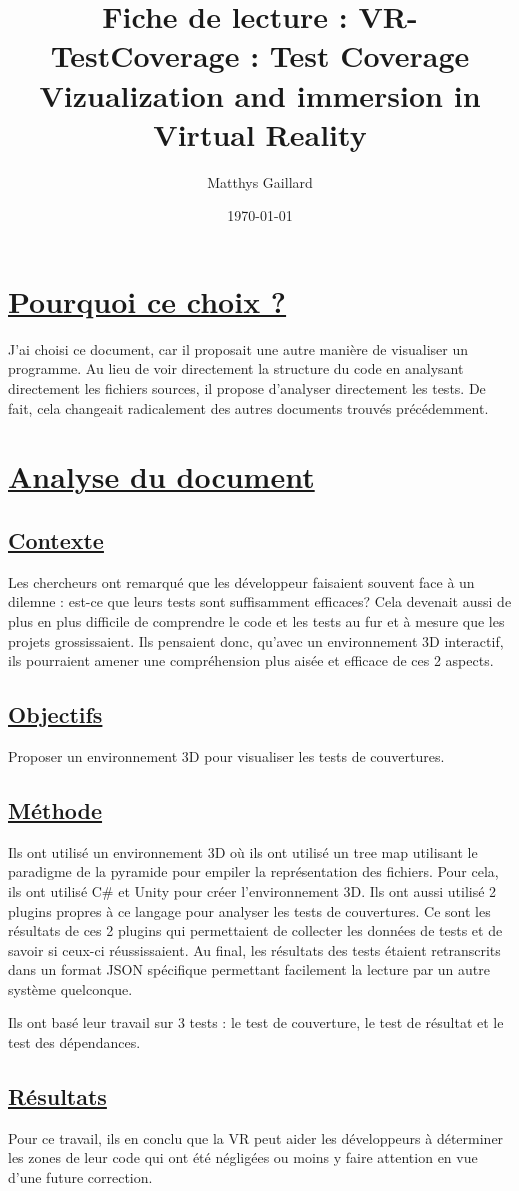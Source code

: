 \documentclass[a4paper,10pt, oneside]{article}
\title{Fiche de lecture : VR-TestCoverage : Test Coverage Vizualization and immersion in Virtual Reality}
\author{Matthys Gaillard}
\date{\today}
\newcommand{\li}{\newline}
\begin{document}
\maketitle
\section{\ul{Pourquoi ce choix ?}}
        \par J'ai choisi ce document\cite{A1}, car il proposait une autre manière de visualiser un programme. Au lieu de voir
        directement la structure du code en analysant directement les fichiers sources, il propose d'analyser directement les tests.
        De fait, cela changeait radicalement des autres documents trouvés précédemment.
\section{\ul{Analyse du document}}
\subsection{\ul{Contexte}}
        \par Les chercheurs ont remarqué que les développeur faisaient souvent face à un dilemne : est-ce que leurs tests sont suffisamment efficaces? 
        Cela devenait aussi de plus en plus difficile de comprendre le code et les tests au fur et à mesure que les projets grossissaient. Ils pensaient donc, 
        qu'avec un environnement 3D interactif, ils pourraient amener une compréhension plus aisée et efficace de ces 2 aspects.
\subsection{\ul{Objectifs}}
        \par Proposer un environnement 3D pour visualiser les tests de couvertures.
\subsection{\ul{Méthode}}
        \par Ils ont utilisé un environnement 3D où ils ont utilisé un tree map utilisant le paradigme de la pyramide pour empiler la représentation des fichiers.
        Pour cela, ils ont utilisé C\# et Unity pour créer l'environnement 3D. Ils ont aussi utilisé 2 plugins propres à ce langage pour analyser les tests de couvertures.
        Ce sont les résultats de ces 2 plugins qui permettaient de collecter les données de tests et de savoir si ceux-ci réussissaient. Au final, les résultats des tests étaient retranscrits dans un format JSON spécifique permettant 
        facilement la lecture par un autre système quelconque. \li 
        \par Ils ont basé leur travail sur 3 tests : le test de couverture, le test de résultat et le test des dépendances.
\subsection{\ul{Résultats}}
        \par Pour ce travail, ils en conclu que la VR peut aider les développeurs à déterminer les zones de leur code qui ont été négligées ou moins y faire attention en vue d'une future correction.
\newpage



\end{document}
